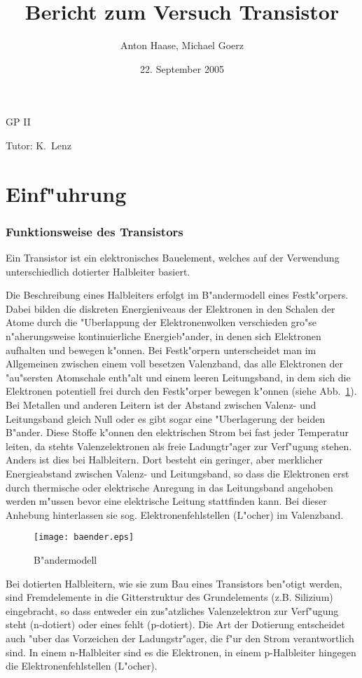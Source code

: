 \documentclass[a4paper,10pt]{article}
\title{Bericht zum Versuch Transistor}
\author{Anton Haase, Michael Goerz}
\date{22. September 2005}
\begin{document}
\maketitle
\noindent GP II

\noindent Tutor: K.~Lenz

\section{Einf"uhrung}
\subsubsection*{Funktionsweise des Transistors}
Ein Transistor ist ein elektronisches Bauelement, welches auf der Verwendung unterschiedlich dotierter Halbleiter basiert.

Die Beschreibung eines Halbleiters erfolgt im B"andermodell eines Festk"orpers. Dabei bilden die diskreten Energieniveaus der Elektronen in den Schalen der Atome durch die "Uberlappung der Elektronenwolken verschieden gro"se n"aherungsweise kontinuierliche Energieb"ander, in denen sich Elektronen aufhalten und bewegen k"onnen. Bei Festk"orpern unterscheidet man im Allgemeinen zwischen einem voll besetzen Valenzband, das alle Elektronen der "au"sersten Atomschale enth"alt und einem leeren Leitungsband, in dem sich die Elektronen potentiell frei durch den Festk"orper bewegen k"onnen (siehe Abb.~\ref{fig:0}). Bei Metallen und anderen Leitern ist der Abstand zwischen Valenz- und Leitungsband gleich Null oder es gibt sogar eine "Uberlagerung der beiden B"ander. Diese Stoffe k"onnen den elektrischen Strom bei fast jeder Temperatur leiten, da stehts Valenzelektronen als freie Ladungtr"ager zur Verf"ugung stehen. Anders ist dies bei Halbleitern. Dort besteht ein geringer, aber merklicher Energieabstand zwischen Valenz- und Leitungsband, so dass die Elektronen erst durch thermische oder elektrische Anregung in das Leitungsband angehoben werden m"ussen bevor eine elektrische Leitung stattfinden kann. Bei dieser Anhebung hinterlassen sie sog. Elektronenfehlstellen (L"ocher) im Valenzband.

\begin{figure}[h]
	\centering
	\texttt{[image: baender.eps]}
	\caption{B"andermodell}
	\label{fig:0}
\end{figure}


Bei dotierten Halbleitern, wie sie zum Bau eines Transistors ben"otigt werden, sind Fremdelemente in die Gitterstruktur des Grundelements (z.B. Silizium) eingebracht, so dass entweder ein zus"atzliches Valenzelektron zur Verf"ugung steht (n-dotiert) oder eines fehlt (p-dotiert). Die Art der Dotierung entscheidet auch "uber das Vorzeichen der Ladungstr"ager, die f"ur den Strom verantwortlich sind. In einem n-Halbleiter sind es die Elektronen, in einem p-Halbleiter hingegen die Elektronenfehlstellen (L"ocher).
\end{document}
